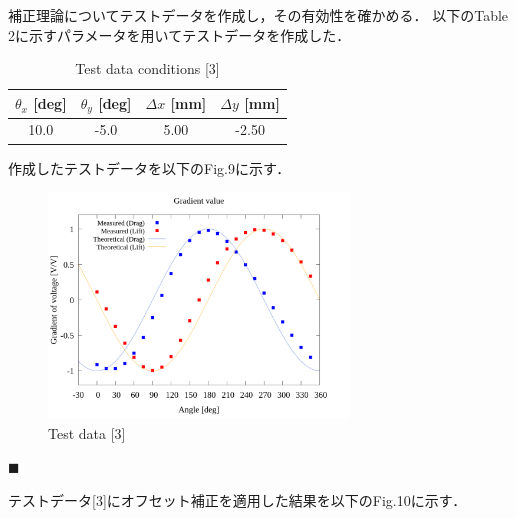 \documentclass[twocolumn,a4j]{jsarticle}
\begin{document}
補正理論についてテストデータを作成し，その有効性を確かめる．
以下のTable 2に示すパラメータを用いてテストデータを作成した．

\begin{table}[htbp]
    \begin{center}
        \caption{Test data conditions [3]}
        \begin{tabular}{|p{20mm}|p{20mm}|p{20mm}|p{20mm}|}
            \hline
            \multicolumn{1}{|c|}{$\theta_x$ [deg]} & \multicolumn{1}{|c|}{$\theta_y$ [deg]} & \multicolumn{1}{|c|}{$\Delta x$ [mm]} & \multicolumn{1}{|c|}{$\Delta y$ [mm]} \\ \hline
            \multicolumn{1}{|c|}{10.0}                              & \multicolumn{1}{|c|}{-5.0}                              & \multicolumn{1}{|c|}{5.00}                          & \multicolumn{1}{|c|}{-2.50}                         \\ \hline
        \end{tabular}
    \end{center}
\end{table}

作成したテストデータを以下のFig.9に示す．

\begin{figure}[htbp]
    \begin{center}
        \includegraphics[width=80mm]{../../../02_workspace/result/simulation_tx=10.0_ty=-5.0_dx=5.00_dy=-2.50/plot/20/20_adjust-value.png}
        \caption{Test data [3]}
    \end{center}
\end{figure}

\noindent $\blacksquare$ 

テストデータ[3]にオフセット補正を適用した結果を以下のFig.10に示す．
\end{document}
